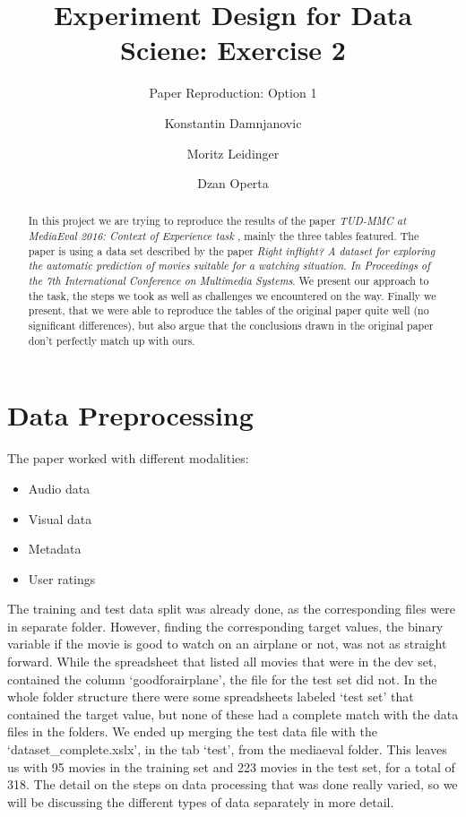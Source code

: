 \documentclass[sigconf]{acmart}
\begin{document}
\title{Experiment Design for Data Sciene: Exercise 2}
\subtitle{Paper Reproduction: Option 1}

\author{Konstantin Damnjanovic}

\author{Moritz Leidinger}

\author{Dzan Operta}

\begin{abstract}
  In this project we are trying to reproduce the results of the paper \textit{TUD-MMC at MediaEval 2016: Context of Experience task} \cite{aa}, mainly the three tables featured. The paper is using a data set described by the paper \textit{Right inflight? A dataset for exploring the automatic prediction of movies suitable for a watching situation. In Proceedings of the 7th International Conference on Multimedia Systems}. \cite{bb} We present our approach to the task, the steps we took as well as challenges we encountered on the way. Finally we present, that we were able to reproduce the tables of the original paper quite well (no significant differences), but also argue that the conclusions drawn in the original paper don't perfectly match up with ours.
\end{abstract}

\maketitle

\section{Data Preprocessing}
The paper worked with different modalities:
\begin{itemize}
  \item {Audio data}
  \item {Visual data}
  \item {Metadata}
  \item {User ratings}
\end{itemize}
The training and test data split was already done, as the corresponding files were in separate folder. However, finding the corresponding target values, the binary variable if the movie is good to watch on an airplane or not, was not as straight forward. While the spreadsheet that listed all movies that were in the dev set, contained the column \lq goodforairplane\rq, the file for the test set did not. In the whole folder structure there were some spreadsheets labeled ‘test set’ that contained the target value, but none of these had a complete match with the data files in the folders. We ended up merging the test data file with the \lq dataset\_complete.xslx\rq , in the tab \lq test\rq, from the mediaeval folder. This leaves us with 95 movies in the training set and 223 movies in the test set, for a total of 318. The detail on the steps on data processing that was done really varied, so we will be discussing the different types of data separately in more detail.
\end{document}
